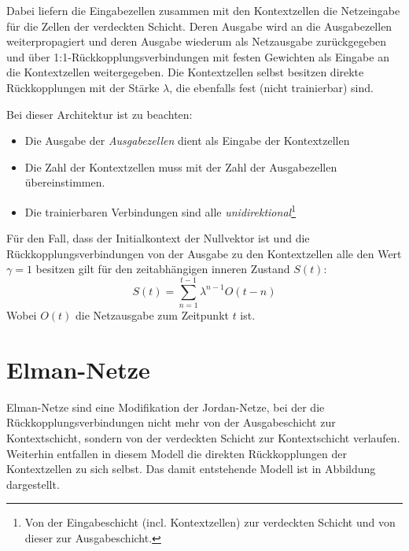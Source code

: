 Dabei liefern die Eingabezellen zusammen mit den Kontextzellen die Netzeingabe für die Zellen der verdeckten Schicht. Deren Ausgabe wird an die Ausgabezellen weiterpropagiert und deren Ausgabe wiederum als Netzausgabe zurückgegeben und über 1:1-Rückkopplungsverbindungen mit festen Gewichten als Eingabe an die Kontextzellen weitergegeben.
Die Kontextzellen selbst besitzen direkte Rückkopplungen mit der Stärke $\lambda$, die ebenfalls fest (nicht trainierbar) sind.

Bei dieser Architektur ist zu beachten:
\begin{itemize}
	\item Die Ausgabe der \emph{Ausgabezellen} dient als Eingabe der Kontextzellen
	\item Die Zahl der Kontextzellen muss mit der Zahl der Ausgabezellen übereinstimmen.
	\item Die trainierbaren Verbindungen sind alle \emph{unidirektional}\footnote{Von der Eingabeschicht (incl. Kontextzellen) zur verdeckten Schicht und von dieser zur Ausgabeschicht.} 
\end{itemize}

Für den Fall, dass der Initialkontext der Nullvektor ist und die Rückkopplungsverbindungen von der Ausgabe zu den Kontextzellen alle den Wert $\gamma = 1$ besitzen gilt für den zeitabhängigen inneren Zustand $S(t)$:
\[
	S(t) = \sum_{n=1}^{t-1} \lambda^{n-1} O(t-n)
\]
Wobei $O(t)$ die Netzausgabe zum Zeitpunkt $t$ ist. 



\section*{Elman-Netze}
Elman-Netze sind eine Modifikation der Jordan-Netze, bei der die Rückkopplungsverbindungen nicht mehr von der Ausgabeschicht zur Kontextschicht, sondern von der verdeckten Schicht zur Kontextschicht verlaufen.
Weiterhin entfallen in diesem Modell die direkten Rückkopplungen der Kontextzellen zu sich selbst. Das damit entstehende Modell ist in Abbildung dargestellt.

